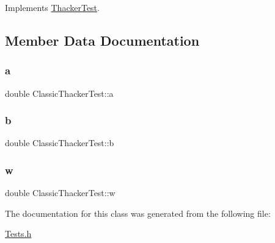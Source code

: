 Implements \hyperlink{classThackerTest_a445339d59012efde1e6d27ab060b6781}{Thacker\+Test}.



\subsection{Member Data Documentation}
\mbox{\label{classClassicThackerTest_a25f90e2b8096f534f71036cc58c2ba95}} 
\subsubsection{\texorpdfstring{a}{a}}
{\footnotesize\ttfamily double Classic\+Thacker\+Test\+::a\hspace{0.3cm}{\ttfamily [private]}}

\mbox{\label{classClassicThackerTest_a47d1748d983fa34782d765fdfc9eea32}} 
\subsubsection{\texorpdfstring{b}{b}}
{\footnotesize\ttfamily double Classic\+Thacker\+Test\+::b\hspace{0.3cm}{\ttfamily [private]}}

\mbox{\label{classClassicThackerTest_a7d8bb5cdf1e9d59153a6d3afba6c308a}} 
\subsubsection{\texorpdfstring{w}{w}}
{\footnotesize\ttfamily double Classic\+Thacker\+Test\+::w\hspace{0.3cm}{\ttfamily [private]}}



The documentation for this class was generated from the following file\+:\begin{DoxyCompactItemize}
\item 
\hyperlink{Tests_8h}{Tests.\+h}\end{DoxyCompactItemize}
